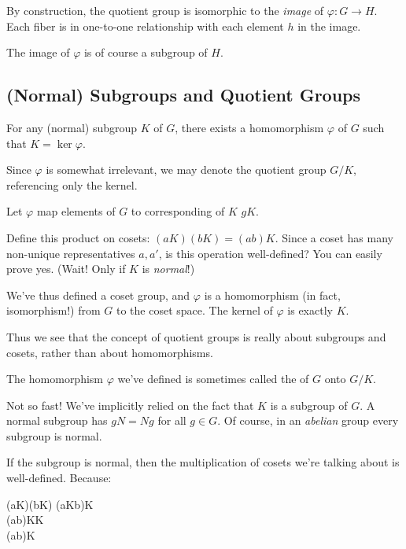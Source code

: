 \begin{remark}
  By construction, the quotient group is isomorphic to the \emph{image}
  of $\varphi: G \to H$. Each fiber is in one-to-one relationship with
  each element $h$ in the image.

  The image of $\varphi$ is of course a subgroup of $H$.
\end{remark}

\subsection{(Normal) Subgroups and Quotient Groups}

\begin{theorem}
  For any (normal) subgroup $K$ of $G$, there exists a homomorphism
  $\varphi$ of $G$ such that $K = \ker\varphi$.

  Since $\varphi$ is somewhat irrelevant, we may denote the quotient
  group $G/K$, referencing only the kernel.
\end{theorem}

\begin{remark}
  Let $\varphi$ map elements of $G$ to corresponding  of
  $K$ $gK$.

  Define this product on cosets: $(aK)(bK) = (ab)K$. Since a
  coset has many non-unique representatives $a, a'$, is this operation
  well-defined? You can easily prove yes. (Wait! Only if $K$ is
  \emph{normal}!)

  We've thus defined a coset group, and $\varphi$ is a homomorphism (in
  fact, isomorphism!) from $G$ to the coset space. The kernel of
  $\varphi$ is exactly $K$.

  Thus we see that the concept of quotient groups is really about
  subgroups and cosets, rather than about homomorphisms.

  The homomorphism $\varphi$ we've defined is sometimes called the
   of $G$ onto $G/K$.
\end{remark}

\begin{remark}
  Not so fast! We've implicitly relied on the fact that $K$ is a
   subgroup of $G$. A normal subgroup has $gN = Ng$ for
  all $g \in G$. Of course, in an \emph{abelian} group every subgroup is
  normal.

  If the subgroup is normal, then the multiplication of cosets we're
  talking about is well-defined. Because:

  \begin{nedqn}
    (aK)(bK)
  \eqcol
    (aKb)K
  \\
  \eqcol
    (ab)KK
  \\
  \eqcol
    (ab)K
  \end{nedqn}
\end{remark}

